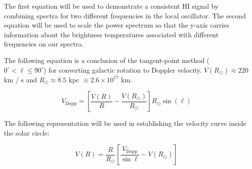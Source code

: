 \documentclass[12pt]{article}
\begin{document}
The first equation will be used to demonstrate a consistent HI signal by combining spectra for two different frequencies in the local oscillator. The second equation will be used to scale the power spectrum so that the y-axis carries information about the brightness temperatures associated with different frequencies on our spectra.

The following equation is a conclusion of the tangent-point method ($0^\circ < \ell \leq 90^\circ$) for converting galactic rotation to Doppler velocity. $V(R_\odot) \approx 220 $ km / s and $R_\odot \approx 8.5$ kpc $\equiv 2.6 \times 10^{17}$ km. 

\begin{equation} \label{eq:vel_dopp}
V_\text{Dopp} = \left[ \frac{V(R)}{R} - \frac{V(R_\odot)}{R_\odot} \right] R_\odot \sin(\ell)
\end{equation}



The following representation will be used in establishing the velocity curve inside the solar circle:

\begin{equation} \label{eq:vel_curve}
V(R) = \frac{R}{R_\odot} \left[ \frac{V_\text{Dopp}}{\sin \ell} - V(R_\odot) \right] 
\end{equation}




\end{document}
